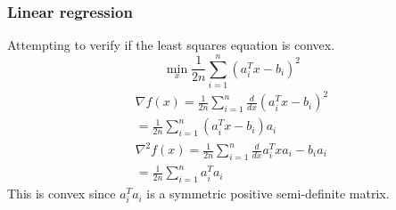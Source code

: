 \subsubsection{Linear regression}
Attempting to verify if the least squares equation is convex.
\begin{equation}
  \min_x \frac{1}{2n} \sum_{i=1}^n (a_i^T x - b_i)^2
\end{equation}
\begin{gather}
  \nabla f(x) = \frac{1}{2n} \sum_{i=1}^n \frac{d }{d x} (a_i^T x -b_i)^2 \\
  = \frac{1}{2n} \sum_{i=1}^n (a_i^T x -b_i)a_i \\
  \nabla^2 f(x) = \frac{1}{2n} \sum_{i=1}^n \frac{d }{d x} a_i^T x a_i - b_i a_i \\
  = \frac{1}{2n} \sum_{i=1}^n a_i^T a_i
\end{gather}
This is convex since $a_i^T a_i$ is a symmetric positive semi-definite matrix.